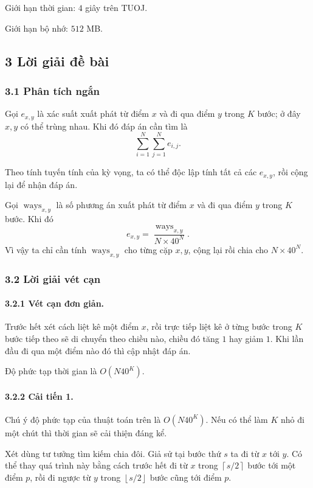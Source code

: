 \documentclass[11pt]{article}
\begin{document}
Giới hạn thời gian: \(4\) giây trên TUOJ.

Giới hạn bộ nhớ: \(512\) MB.

\subsection*{3 Lời giải đề bài}

\subsubsection*{3.1 Phân tích ngắn}

Gọi \(e_{x,y}\) là xác suất xuất phát từ điểm \(x\) và đi qua điểm \(y\) trong
\(K\) bước; ở đây \(x,y\) có thể trùng nhau. Khi đó đáp án cần tìm là
\[
  \sum_{i=1}^{N}\sum_{j=1}^{N} e_{i,j}.
\]

Theo tính tuyến tính của kỳ vọng, ta có thể độc lập tính tất cả các
\(e_{x,y}\), rồi cộng lại để nhận đáp án.

Gọi \(\operatorname{ways}_{x,y}\) là số phương án xuất phát từ điểm \(x\) và đi
qua điểm \(y\) trong \(K\) bước. Khi đó
\[
  e_{x,y}=\frac{\operatorname{ways}_{x,y}}{N\times 40^N}.
\]
Vì vậy ta chỉ cần tính \(\operatorname{ways}_{x,y}\) cho từng cặp \(x,y\), cộng
lại rồi chia cho \(N\times 40^N\).

\subsubsection*{3.2 Lời giải vét cạn}

\paragraph{3.2.1 Vét cạn đơn giản.}
Trước hết xét cách liệt kê một điểm \(x\), rồi trực tiếp liệt kê ở từng bước
trong \(K\) bước tiếp theo sẽ di chuyển theo chiều nào, chiều đó tăng \(1\) hay
giảm \(1\). Khi lần đầu đi qua một điểm nào đó thì cập nhật đáp án.

Độ phức tạp thời gian là \(O(N40^K)\).

\paragraph{3.2.2 Cải tiến 1.}
Chú ý độ phức tạp của thuật toán trên là \(O(N40^K)\). Nếu có thể làm \(K\)
nhỏ đi một chút thì thời gian sẽ cải thiện đáng kể.

Xét dùng tư tưởng tìm kiếm chia đôi. Giả sử tại bước thứ \(s\) ta đi từ \(x\)
tới \(y\). Có thể thay quá trình này bằng cách trước hết đi từ \(x\) trong
\(\left\lceil s/2\right\rceil\) bước tới một điểm \(p\), rồi đi ngược từ \(y\)
trong \(\left\lfloor s/2\right\rfloor\) bước cũng tới điểm \(p\).
\end{document}
